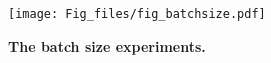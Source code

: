 \begin{figure}[h]
 \centering
 \hspace{-0.0cm}
  \texttt{[image: Fig\_files/fig\_batchsize.pdf]}
  \caption{\textbf{The batch size experiments.}}
  \label{hyper_batch}
\end{figure}

